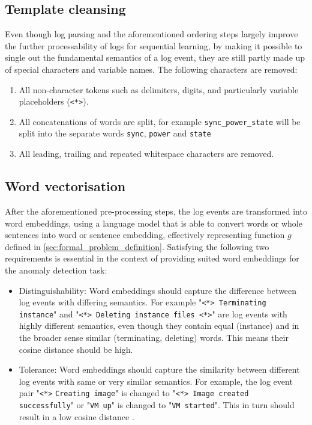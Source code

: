 \subsection{Template cleansing \label{sec:template_cleansing}}
Even though log parsing and the aforementioned ordering steps largely improve the further processability of logs for sequential learning, by making it possible to single out the fundamental semantics of a log event, they are still partly made up of special characters and variable names. The following characters are removed:
\begin{enumerate}
	\item All non-character tokens such as delimiters, digits, and particularly variable placeholders (\verb!<*>!).
	\item All concatenations of words are split, for example \verb!sync_power_state! will be split into the separate words \verb!sync!, \verb!power! and \verb!state!
	\item All leading, trailing and repeated whitespace characters are removed.
\end{enumerate}

\subsection{Word vectorisation \label{sec:word_vectorization}}
After the aforementioned pre-processing steps, the log events are transformed into word embeddings, using a language model that is able to convert words or whole sentences into word or sentence embedding, effectively representing function $g$ defined in \ref{sec:formal_problem_definition}. Satisfying the following two requirements is essential in the context of providing suited word embeddings for the anomaly detection task:
\begin{itemize}
	\item Distinguishability: Word embeddings should capture the difference between log events with differing semantics. For example "\verb!<*> Terminating instance!" and "\verb!<*> Deleting instance files <*>!" are log events with highly different semantics, even though they contain equal (instance) and in the broader sense similar (terminating, deleting) words. This means their cosine distance should be high.
	\item Tolerance: Word embeddings should capture the similarity between different log events with same or very similar semantics. For example, the log event pair "\verb!<*>! \verb!Creating image!" is changed to "\verb!<*> Image created successfully!" or "\verb!VM up!" is changed to "\verb!VM started!". This in turn should result in a low cosine distance \cite{zhang2019robust}.
\end{itemize}

